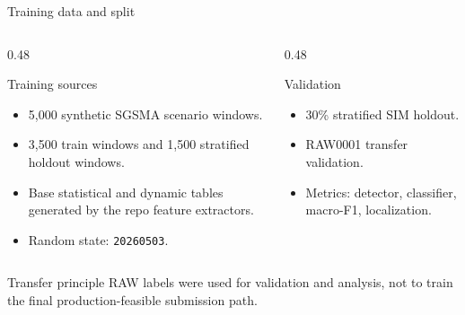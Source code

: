 \documentclass[aspectratio=169,10pt,t]{beamer}
\newcommand{\code}[1]{\texttt{\footnotesize #1}}
\begin{document}
\begin{frame}{Training data and split}
\small
\begin{columns}[T,totalwidth=\textwidth]
\begin{column}{0.48\textwidth}
\begin{block}{Training sources}
\begin{itemize}
  \item 5,000 synthetic SGSMA scenario windows.
  \item 3,500 train windows and 1,500 stratified holdout windows.
  \item Base statistical and dynamic tables generated by the repo feature extractors.
  \item Random state: \code{20260503}.
\end{itemize}
\end{block}
\end{column}
\begin{column}{0.48\textwidth}
\begin{exampleblock}{Validation}
\begin{itemize}
  \item 30\% stratified SIM holdout.
  \item RAW0001 transfer validation.
  \item Metrics: detector, classifier, macro-F1, localization.
\end{itemize}
\end{exampleblock}
\end{column}
\end{columns}
\vspace{2mm}
\begin{alertblock}{Transfer principle}
RAW labels were used for validation and analysis, not to train the final production-feasible submission path.
\end{alertblock}
\end{frame}
\end{document}
